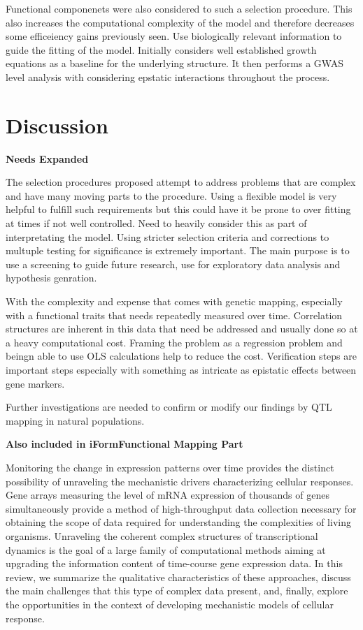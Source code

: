 \documentclass[11pt,]{book}
\theoremstyle{definition}
\theoremstyle{definition}
\theoremstyle{remark}
\begin{document}
Functional componenets were also considered to such a selection
procedure. This also increases the computational complexity of the model
and therefore decreases some efficeiency gains previously seen. Use
biologically relevant information to guide the fitting of the model.
Initially considers well established growth equations as a baseline for
the underlying structure. It then performs a GWAS level analysis with
considering epstatic interactions throughout the process.

\section{Discussion}\label{discussion-3}

\textbf{Needs Expanded}

The selection procedures proposed attempt to address problems that are
complex and have many moving parts to the procedure. Using a flexible
model is very helpful to fulfill such requirements but this could have
it be prone to over fitting at times if not well controlled. Need to
heavily consider this as part of interpretating the model. Using
stricter selection criteria and corrections to multuple testing for
significance is extremely important. The main purpose is to use a
screening to guide future research, use for exploratory data analysis
and hypothesis genration.

With the complexity and expense that comes with genetic mapping,
especially with a functional traits that needs repeatedly measured over
time. Correlation structures are inherent in this data that need be
addressed and usually done so at a heavy computational cost. Framing the
problem as a regression problem and beingn able to use OLS calculations
help to reduce the cost. Verification steps are important steps
especially with something as intricate as epistatic effects between gene
markers.

Further investigations are needed to confirm or modify our findings by
QTL mapping in natural populations.

\textbf{Also included in iFormFunctional Mapping Part}

Monitoring the change in expression patterns over time provides the
distinct possibility of unraveling the mechanistic drivers
characterizing cellular responses. Gene arrays measuring the level of
mRNA expression of thousands of genes simultaneously provide a method of
high-throughput data collection necessary for obtaining the scope of
data required for understanding the complexities of living organisms.
Unraveling the coherent complex structures of transcriptional dynamics
is the goal of a large family of computational methods aiming at
upgrading the information content of time-course gene expression data.
In this review, we summarize the qualitative characteristics of these
approaches, discuss the main challenges that this type of complex data
present, and, finally, explore the opportunities in the context of
developing mechanistic models of cellular response.
\cite{androulakis2007analysis}
\end{document}
